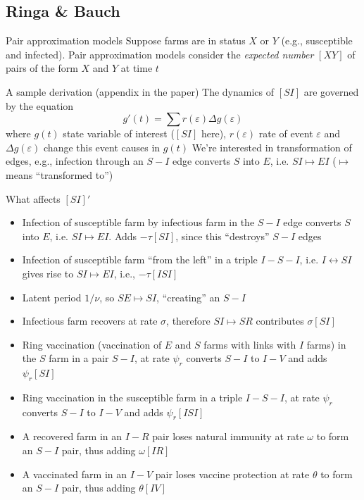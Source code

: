 \documentclass[aspectratio=43]{beamer}
\begin{document}

\subsection{Ringa \& Bauch}

\begin{frame}{Pair approximation models}
	Suppose farms are in status $X$ or $Y$ (e.g., susceptible and infected).
	Pair approximation models consider the \emph{expected number} $[XY]$ of pairs of the form $X$ and $Y$ at time $t$
\end{frame}

\begin{frame}{A sample derivation (appendix in the paper)}
	The dynamics of $[SI]$ are governed by the equation
	\[
		g'(t)=\sum r(\varepsilon)\Delta g(\varepsilon)
	\]
	where $g(t)$ state variable of interest ($[SI]$ here), $r(\varepsilon)$ rate of event $\varepsilon$ and $\Delta g(\varepsilon)$ change this event causes in $g(t)$
	\vfill
	We're interested in transformation of edges, e.g., infection through an $S-I$ edge converts $S$ into $E$, i.e. $SI\mapsto EI$ ($\mapsto$ means ``transformed to'')
\end{frame}
	
\begin{frame}{What affects $[SI]'$}
	\begin{itemize}
		\item Infection of susceptible farm by infectious farm in the
		$S-I$ edge converts $S$ into $E$, i.e. $SI\mapsto EI$. Adds $-\tau[SI]$, since this ``destroys'' $S-I$ edges
		\item Infection of susceptible farm ``from the left'' in a triple $I-S-I$,
		i.e. $I\leftrightarrow SI$ gives rise to $SI\mapsto EI$, i.e., $-\tau[ISI]$
		\item Latent period $1/\nu$, so $SE\mapsto SI$, ``creating'' an $S-I$
		\item Infectious farm recovers at rate $\sigma$, therefore $SI\mapsto SR$ contributes $\sigma[SI]$ 
		\item Ring vaccination (vaccination of $E$ and $S$ farms with links with $I$ farms) in the $S$ farm in a pair $S-I$, at rate $\psi_r$ converts $S-I$ to $I-V$ and adds $\psi_r[SI]$
		\item Ring vaccination in the susceptible farm in a triple $I-S-I$, at rate
		$\psi_r$ converts $S-I$ to $I-V$ and adds $\psi_r[ISI]$
		\item A recovered farm in an $I-R$ pair loses natural immunity at rate
		$\omega$ to form an $S-I$ pair, thus adding $\omega[IR]$
		\item A vaccinated farm in an $I-V$ pair loses vaccine protection at rate $\theta$ to form an $S-I$ pair, thus adding $\theta[IV]$
	\end{itemize}
\end{frame}
\end{document}
